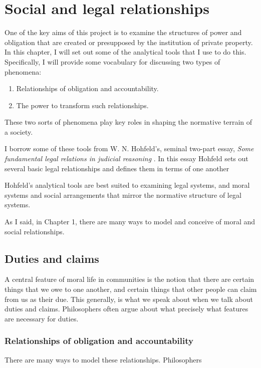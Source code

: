 \chapter{Social and legal relationships}
\label{cha:soci-legal-relat}
One of the key aims of this project is to examine the structures of power and
obligation that are created or presupposed by the institution of private property.
In this chapter, I will set out some of the analytical tools that I use to do
this.
Specifically, I will provide some vocabulary for discussing two types of
phenomena:

\begin{enumerate}
\item Relationships of obligation and accountability.

\item The power to transform such relationships.
\end{enumerate}

These two sorts of phenomena play key roles in shaping the normative terrain of a
society.

I borrow some of these tools from W. N. Hohfeld's, seminal two-part essay, \emph{Some
fundamental legal relations in judicial reasoning}
\citeyearpar{hohfeldfundamentallegal1913,hohfeldfundamentallegal1917}.
In this essay Hohfeld sets out several basic legal relationships and defines them
in terms of one another \citeyearpar[pp.
  28–59]{hohfeldfundamentallegal1913}

Hohfeld's analytical tools are best suited to examining legal systems, and moral
systems and social arrangements that mirror the normative structure of legal
systems.

As I said, in Chapter 1, there are many ways to model and conceive of moral and
social relationships.
\section{Duties and claims}
\label{sec:duties-claims}
A central feature of moral life in communities is the notion that there are
certain things that we owe to one another, and certain things that other people
can claim from us as their due.
This generally, is what we speak about when we talk about duties and claims.
Philosophers often argue about what precisely what features are necessary for
duties.
\subsection{Relationships of obligation and accountability}
\label{sec:obl-acc}
There are many ways to model these relationships.
Philosophers
